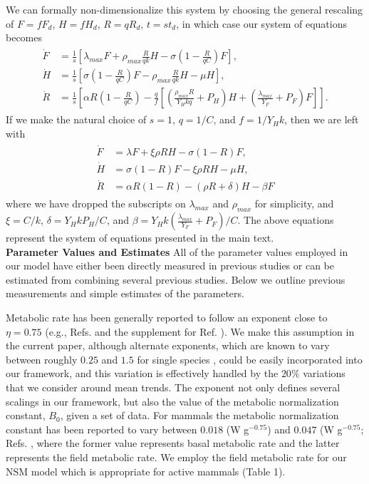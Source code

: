 \documentclass[twocolumn,preprintnumbers,amsmath,amssymb,superscriptaddress]{revtex4}
\begin{document}
We can formally non-dimensionalize this system by choosing the general rescaling of $F=fF_{d}$, $H=fH_{d}$, $R=qR_{d}$, $t=st_{d}$, in which case our system of equations becomes
\begin{align}
\begin{split}
\dot{F} &= \frac{1}{s}\left[\lambda_{max} F + \rho_{max}\frac{R}{qk}H - \sigma \left(1-\frac{R}{qC}\right)F\right],  \\
\dot{H} &= \frac{1}{s}\left[\sigma \left(1-\frac{R}{qC}\right)F - \rho_{max}\frac{R}{qk} H - \mu H\right],  \\
\dot{R} &= \frac{1}{s}\left[\alpha R\left(1-\frac{R}{qC}\right) -\frac{q}{f}\left[\left(\frac{\rho_{max}R}{Y_{H}kq}+P_{H}\right)H+\left(\frac{\lambda_{max}}{Y_{F}}+P_{F}\right) F\right]\right].
\end{split}
\end{align}
If we make the natural choice of $s=1$, $q=1/C$, and $f=1/Y_{H}k$, then we are left with
\begin{align}
\begin{split}
\dot{F} &= \lambda F + \xi \rho RH - \sigma \left(1-R\right)F,  \\
\dot{H} &= \sigma \left(1-R\right)F - \xi \rho RH - \mu H,  \\
\dot{R} &= \alpha R\left(1-R\right) -\left(\rho R+\delta\right)H-\beta F
\end{split}
\end{align}
where we have dropped the subscripts on $\lambda_{max}$ and $\rho_{max}$ for simplicity, and $\xi=C/k$, $\delta=Y_{H}kP_{H}/C$, and $\beta=Y_{H}k\left(\frac{\lambda_{max}}{Y_{F}}+P_{F}\right)/C$. The above equations represent the system of equations presented in the main text.
\\

{\bf Parameter Values and Estimates}
All of the parameter values employed in our model have either been directly measured in previous studies or can be estimated from combining several previous studies. Below we outline previous measurements and simple estimates of the parameters.

Metabolic rate has been generally reported to follow an exponent close to $\eta=0.75$ (e.g., Refs. \citep{West:2001bv,moses2008rmo} and the supplement for Ref. \citep{hou}). We make this assumption in the current paper, although alternate exponents, which are known to vary between roughly $0.25$ and $1.5$ for single species \citep{moses2008rmo}, could be easily incorporated into our framework, and this variation is effectively handled by the $20\%$ variations that we consider around mean trends. The exponent not only defines several scalings in our framework, but also the value of the metabolic normalization constant, $B_{0}$, given a set of data.  For mammals the metabolic normalization constant has been reported to vary between $0.018$ (W g$^{-0.75}$) and $0.047$ (W g$^{-0.75}$; Refs. \citep{hou,West:2001bv}, where the former value represents basal metabolic rate and the latter represents the field metabolic rate. We employ the field metabolic rate for our NSM model which is appropriate for active mammals (Table 1).
\end{document}
